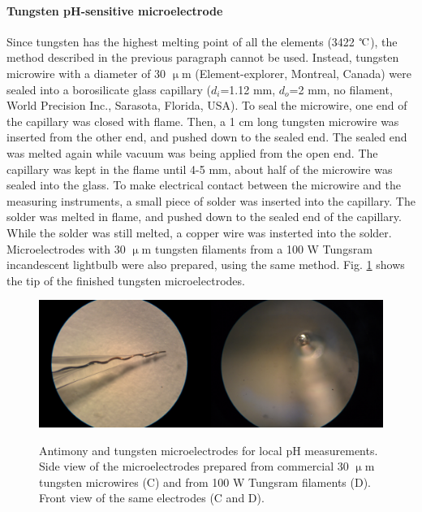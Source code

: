 				\paragraph{Tungsten pH-sensitive microelectrode}
Since tungsten has the highest melting point of all the elements (3422 $\celsius$), the method described in the previous paragraph cannot be used.
Instead, tungsten microwire with a diameter of 30 $\upmu$m (Element-explorer, Montreal, Canada) were sealed into a borosilicate glass capillary ($d_i$=1.12 mm, $d_o$=2 mm, no filament, World Precision Inc., Sarasota, Florida, USA).
To seal the microwire, one end of the capillary was closed with flame.
Then, a 1 cm long tungsten microwire was inserted from the other end, and pushed down to the sealed end.
The sealed end was melted again while vacuum was being applied from the open end.
The capillary was kept in the flame until 4-5 mm, about half of the microwire was sealed into the glass.
To make electrical contact between the microwire and the measuring instruments, a small piece of solder was inserted into the capillary.
The solder was melted in flame, and pushed down to the sealed end of the capillary.
While the solder was still melted, a copper wire was insterted into the solder.
Microelectrodes with 30 $\upmu$m tungsten filaments from a 100 W Tungsram incandescent lightbulb were also prepared, using the same method.
Fig. \ref{fig:tungsten_electrode} shows the tip of the finished tungsten microelectrodes.

\begin{figure}
\centering
\includegraphics[width=0.5\textwidth]{img/wolfram_electrode1.jpg}\includegraphics[width=0.5\textwidth]{img/wolfram_electrode2.jpg}

\caption[Antimony and tungsten microelectrodes for local pH measurements.]{Antimony and tungsten microelectrodes for local pH measurements.
Side view of the microelectrodes prepared from commercial 30 $\upmu$m tungsten microwires (C) and from 100 W Tungsram filaments (D).
Front view of the same electrodes (C and D).}
\label{fig:tungsten_electrode}
\end{figure}

